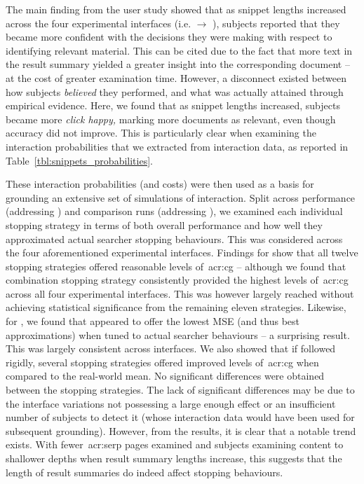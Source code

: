 The main finding from the user study showed that as snippet lengths increased across the four experimental interfaces (i.e.  $\rightarrow$ ), subjects reported that they became more confident with the decisions they were making with respect to identifying relevant material. This can be cited due to the fact that more text in the result summary yielded a greater insight into the corresponding document -- at the cost of greater examination time. However, a disconnect existed between how subjects \emph{believed} they performed, and what was actually attained through empirical evidence. Here, we found that as snippet lengths increased, subjects became more \emph{click happy,} marking more documents as relevant, even though accuracy did not improve. This is particularly clear when examining the interaction probabilities that we extracted from interaction data, as reported in Table~\ref{tbl:snippets_probabilities}.

These interaction probabilities (and costs) were then used as a basis for grounding an extensive set of simulations of interaction. Split across performance (addressing ) and comparison runs (addressing ), we examined each individual stopping strategy in terms of both overall performance and how well they approximated actual searcher stopping behaviours. This was considered across the four aforementioned experimental interfaces. Findings for  show that all twelve stopping strategies offered reasonable levels of~\gls{acr:cg} -- although we found that combination stopping strategy  consistently provided the highest levels of~\gls{acr:cg} across all four experimental interfaces. This was however largely reached without achieving statistical significance from the remaining eleven strategies. Likewise, for , we found that  appeared to offer the lowest MSE (and thus best approximations) when tuned to actual searcher behaviours -- a surprising result. This was largely consistent across interfaces. We also showed that if followed rigidly, several stopping strategies offered improved levels of~\gls{acr:cg} when compared to the real-world mean. No significant differences were obtained between the stopping strategies. The lack of significant differences may be due to the interface variations not possessing a large enough effect or an insufficient number of subjects to detect it (whose interaction data would have been used for subsequent grounding). However, from the results, it is clear that a notable trend exists. With fewer~\gls{acr:serp} pages examined and subjects examining content to shallower depths when result summary lengths increase, this suggests that the length of result summaries do indeed affect stopping behaviours.


